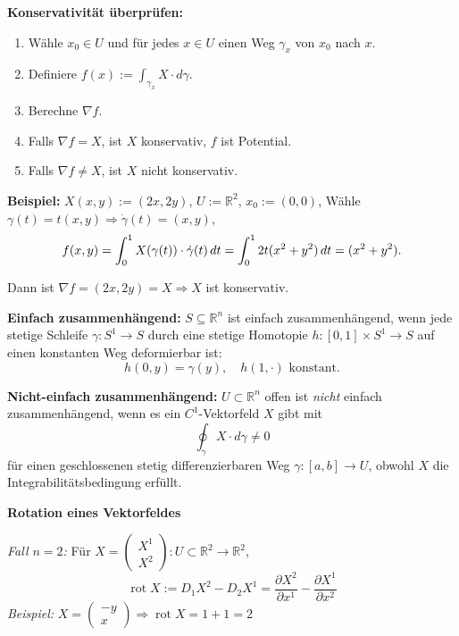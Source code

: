 \textbf{Konservativität überprüfen:}

\begin{enumerate}
  \item Wähle \( x_0 \in U \) und für jedes \( x \in U \) einen Weg \( \gamma_x \) von \( x_0 \) nach \( x \).
  \item Definiere \( f(x) := \int_{\gamma_x} X \cdot d\gamma \).
  \item Berechne \( \nabla f \).
  \item Falls \( \nabla f = X \), ist \( X \) konservativ, \( f \) ist Potential.
  \item Falls \( \nabla f \neq X \), ist \( X \) nicht konservativ.
\end{enumerate}

\textbf{Beispiel:}  
\( X(x, y) := (2x, 2y) \), \( U := \mathbb{R}^2 \), \( x_0 := (0,0) \),  
Wähle \( \gamma(t) = t(x,y) \Rightarrow \dot{\gamma}(t) = (x,y) \),  
\[
f(x, y) = \int_0^1 X(\gamma(t)) \cdot \dot{\gamma}(t)\,dt 
= \int_0^1 2t(x^2 + y^2)\,dt \\ = (x^2 + y^2).
\]  

Dann ist \( \nabla f = (2x, 2y) = X \Rightarrow X \) ist konservativ.

\textbf{Einfach zusammenhängend:}  
\( S \subseteq \mathbb{R}^n \) ist einfach zusammenhängend, wenn jede stetige Schleife \( \gamma : S^1 \to S \) durch eine stetige Homotopie \( h : [0,1] \times S^1 \to S \) auf einen konstanten Weg deformierbar ist:
\[
h(0, y) = \gamma(y), \quad h(1, \cdot) \text{ konstant}.
\]

\textbf{Nicht-einfach zusammenhängend:}  
\( U \subset \mathbb{R}^n \) offen ist \emph{nicht} einfach zusammenhängend, wenn es ein \( C^1 \)-Vektorfeld \( X \) gibt mit  
\[
\oint_\gamma X \cdot d\gamma \neq 0
\]
für einen geschlossenen stetig differenzierbaren Weg \( \gamma : [a,b] \to U \), obwohl \( X \) die Integrabilitätsbedingung erfüllt.

\textbf{Rotation eines Vektorfeldes}

\textit{Fall \(n=2\):} Für \( X = \begin{pmatrix} X^1 \\ X^2 \end{pmatrix} : U \subset \mathbb{R}^2 \to \mathbb{R}^2 \),
\[
\operatorname{rot} X := D_1 X^2 - D_2 X^1 = \frac{\partial X^2}{\partial x^1} - \frac{\partial X^1}{\partial x^2}
\]
\textit{Beispiel:} \( X = \begin{pmatrix} -y \\ x \end{pmatrix} \Rightarrow \operatorname{rot} X = 1 + 1 = 2 \)

